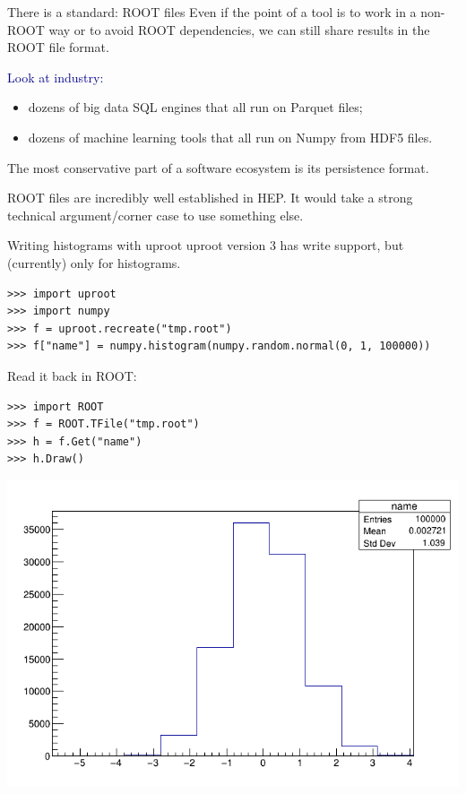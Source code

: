 \documentclass[aspectratio=169]{beamer}
\begin{document}
\begin{frame}{There is a standard: ROOT files}
\large
\vspace{0.5 cm}
Even if the point of a tool is to work in a non-ROOT way or to avoid ROOT dependencies, we can still share results in the ROOT file format.

\vspace{1 cm}
\textcolor{darkblue}{Look at industry:}
\begin{itemize}
\item dozens of big data SQL engines that all run on Parquet files;
\item dozens of machine learning tools that all run on Numpy from HDF5 files.
\end{itemize}

\vspace{0.25 cm}
The most conservative part of a software ecosystem is its persistence format.

\vspace{1 cm}
ROOT files are incredibly well established in HEP. It would take a strong technical argument/corner case to use something else.
\end{frame}

\begin{frame}[fragile]{Writing histograms with uproot}
\large
\vspace{0.5 cm}
uproot version 3 has write support, but (currently) only for histograms.

\small
\begin{verbatim}
>>> import uproot
>>> import numpy
>>> f = uproot.recreate("tmp.root")
>>> f["name"] = numpy.histogram(numpy.random.normal(0, 1, 100000))
\end{verbatim}

\vspace{1 cm}
\large
Read it back in ROOT:

\small
\begin{verbatim}
>>> import ROOT
>>> f = ROOT.TFile("tmp.root")
>>> h = f.Get("name")
>>> h.Draw()
\end{verbatim}

\vspace{-3.5 cm}
\hfill \includegraphics[width=0.5\linewidth]{root-hist.png}
\end{frame}
\end{document}

